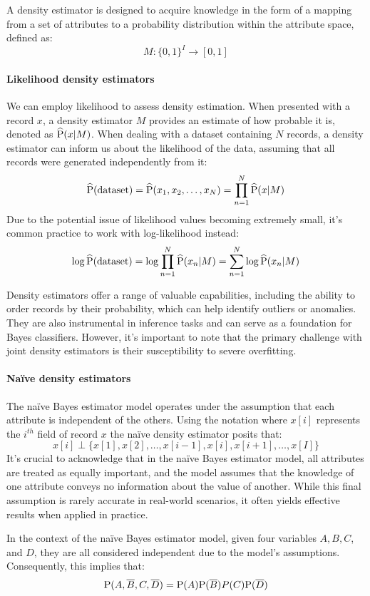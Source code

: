 \begin{definition}
    A density estimator is designed to acquire knowledge in the form of a mapping from a set of attributes to a probability distribution within the attribute space, defined as:
    \[M:\{0,1\}^I \rightarrow [0,1]\]
\end{definition}

\paragraph*{Likelihood density estimators}
We can employ likelihood to assess density estimation. 
When presented with a record $x$, a density estimator $M$ provides an estimate of how probable it is, denoted as $\widehat{\textnormal{P}}(x|M)$. 
When dealing with a dataset containing $N$ records, a density estimator can inform us about the likelihood of the data, assuming that all records were generated independently from it:
\[\widehat{\textnormal{P}}(\textnormal{dataset})=\widehat{\textnormal{P}}(x_1,x_2,\dots,x_N)=\prod_{n=1}^{N}\widehat{\textnormal{P}}(x|M)\]
Due to the potential issue of likelihood values becoming extremely small, it's common practice to work with log-likelihood instead:
\[\log{\widehat{\textnormal{P}}(\textnormal{dataset})}=\log{\prod_{n=1}^{N}{\widehat{\textnormal{P}}(x_n|M)}}=\sum_{n=1}^{N}{\log{\widehat{\textnormal{P}}(x_n|M)}}\]

Density estimators offer a range of valuable capabilities, including the ability to order records by their probability, which can help identify outliers or anomalies. 
They are also instrumental in inference tasks and can serve as a foundation for Bayes classifiers. 
However, it's important to note that the primary challenge with joint density estimators is their susceptibility to severe overfitting.

\paragraph*{Naïve density estimators}
The naïve Bayes estimator model operates under the assumption that each attribute is independent of the others. 
Using the notation where $x[i]$ represents the $i^{th}$ field of record $x$ the naïve density estimator posits that:
\[x[i] \perp \{x[1],x[2],\dots,x[i-1],x[i],x[i+1],\dots,x[I]\}\]
It's crucial to acknowledge that in the naïve Bayes estimator model, all attributes are treated as equally important, and the model assumes that the knowledge of one attribute conveys no information about the value of another. 
While this final assumption is rarely accurate in real-world scenarios, it often yields effective results when applied in practice.
\begin{example}
    In the context of the naïve Bayes estimator model, given four variables $A,B,C$, and $D$, they are all considered independent due to the model's assumptions. Consequently, this implies that:
    \[\textnormal{P}(A,\overline{B},C,\overline{D}) = \textnormal{P}(A)\textnormal{P}(\overline{B})P(C)\textnormal{P}(\overline{D})\]
\end{example}

